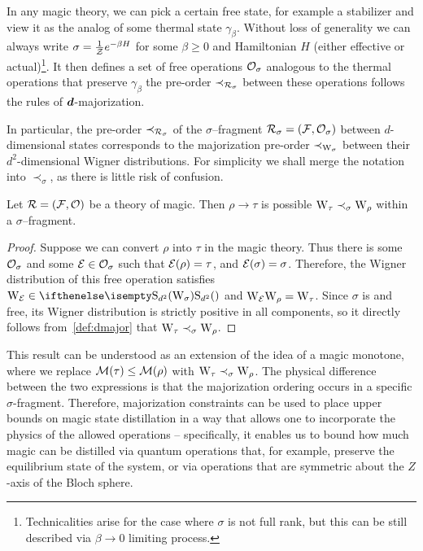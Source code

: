 \documentclass[pra,
aps,
twocolumn,
superscriptaddress,
groupedaddress,
nofootinbib,
reprint
]{revtex4-1}
\begin{document}
In any magic theory, we can pick a certain free state, for example a stabilizer and view it as the analog of some thermal state $\gamma_\beta$.
Without loss of generality we can always write $\sigma = \frac{1}{\mathcal{Z}} e^{-\beta H}$ for some $\beta \ge 0$ and Hamiltonian $H$ (either effective or actual)\footnote{Technicalities arise for the case where $\sigma$ is not full rank, but this can be still described via $ \beta \rightarrow 0$ limiting process.}.
It then defines a set of free operations $\mathcal{O}_\sigma$ analogous to the thermal operations that preserve $\gamma_\beta$ the pre-order $\prec_{\mathcal{R}_\sigma}$ between these operations follows the rules of $\bm{d}$-majorization.


In particular, the pre-order $\prec_{\mathcal{R}_\sigma}$ of the $\sigma$--fragment $\mathcal{R}_\sigma = (\mathcal{F}, \mathcal{O}_\sigma)$ between $d$-dimensional states corresponds to the majorization pre-order $\prec_{\W{\sigma}}$ between their $d^2$-dimensional Wigner distributions.
For simplicity we shall merge the notation into $\prec_\sigma$, as there is little risk of confusion.


\begin{theorem}\label{thm:sigmamajor}
    Let $\mathcal{R} = (\mathcal{F}, \mathcal{O})$ be a theory of magic. Then $\rho \longrightarrow \tau$ is possible   $\W{\tau} \prec_\sigma \W{\rho}$ within a $\sigma$--fragment.
\end{theorem}
\begin{proof}
Suppose we can convert $\rho$ into $\tau$ in the magic theory. 
Thus there is some $\mathcal{O}_\sigma$ and some $\mathcal{E} \in \mathcal{O}_\sigma$ such that $\mathcal{E}(\rho) = \tau$, and $\mathcal{E}(\sigma)=\sigma$. 
Therefore, the Wigner distribution of this free operation satisfies $\W{\E} \in \stochw$ and $\W{\E}\W{\rho} = \W{\tau}$. 
Since $\sigma$ is  and free, its Wigner distribution is strictly positive in all components, so it directly follows from~\cref{def:dmajor} that $\W{\tau} \prec_{\sigma} \W{\rho}$.
\end{proof}
This result can be understood as an extension of the idea of a magic monotone, where we replace $\mathcal{M}(\tau) \leq \mathcal{M}(\rho)$ with $\W{\tau} \prec_\sigma \W{\rho}$. 
The physical difference between the two expressions is that the majorization ordering occurs in a specific $\sigma$-fragment.
Therefore, majorization constraints can be used to place upper bounds on magic state distillation in a way that allows one to incorporate the physics of the allowed operations -- specifically, it enables us to bound how much magic can be distilled via quantum operations that, for example, preserve the equilibrium state of the system, or via operations that are symmetric about the $Z$-axis of the Bloch sphere.
\end{document}
